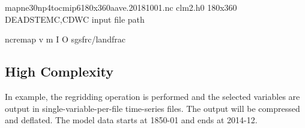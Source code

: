 \documentclass[letterpaper,10pt,english]{sphinxmanual}
\begin{document}
\begin{sphinxVerbatim}[commandchars=\\\{\}]
map\PYGZus{}ne30np4\PYGZus{}to\PYGZus{}cmip6\PYGZus{}180x360\PYGZus{}aave.20181001.nc   
clm2.h0                                       
180x360                                      
DEADSTEMC,CDWC                                     
\PYGZlt{}input file path\PYGZgt{}                             

ncremap \PYGZhy{}v  \PYGZhy{}m  \PYGZhy{}I  \PYGZhy{}O  \PYGZhy{}\PYGZhy{}sgs\PYGZus{}frc/landfrac
\end{sphinxVerbatim}


\subsection{High Complexity}
\label{\detokenize{lnd_regrid:high-complexity}}
In example, the regridding operation is performed and the selected variables are output in single-variable-per-file time-series files.
The output will be compressed and deflated. The model data starts at 1850-01 and ends at 2014-12.
\end{document}
